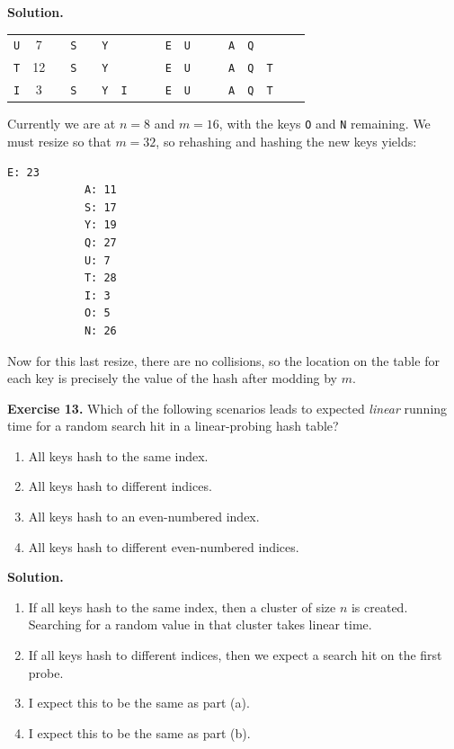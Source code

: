 \documentclass[12pt, a4paper]{article}
\newenvironment{ex}[2][Exercise]
{\par\medskip\noindent \textbf{#1 #2.}}
{\medskip}
\newenvironment{sol}[1][Solution]
{\par\medskip\noindent \textbf{#1.} }
{\medskip}
\begin{document}
\begin{sol}
\begin{center}
\begin{tabular}{cc|cccccccccccccccc}
				\texttt{U} & 7 &
				{} & {\color{gray}\texttt{S}} & {} & {\color{gray}\texttt{Y}} & {} & {} & {} & {\color{black} \texttt{E}} & {\color{red}\texttt{U}} & {} & {} & {\color{gray}\texttt{A}} & {\color{gray}\texttt{Q}} & {} & {} & {} \\
				
				\texttt{T} & 12 &
				{} & {\color{gray}\texttt{S}} & {} & {\color{gray}\texttt{Y}} & {} & {} & {} & {\color{gray} \texttt{E}} & {\color{gray}\texttt{U}} & {} & {} & {\color{gray}\texttt{A}} & {\color{black}\texttt{Q}} & {\color{red}\texttt{T}} & {} & {} \\
				
				\texttt{I} & 3 &
				{} & {\color{gray}\texttt{S}} & {} & {\color{black}\texttt{Y}} & {\color{red}\texttt{I}} & {} & {} & {\color{gray} \texttt{E}} & {\color{gray}\texttt{U}} & {} & {} & {\color{gray}\texttt{A}} & {\color{gray}\texttt{Q}} & {\color{gray}\texttt{T}} & {} & {} \\
			\end{tabular}
		\end{center}
		Currently we are at $n=8$ and $m=16$, with the keys \texttt{O} and \texttt{N} remaining.
		We must resize so that $m=32$, so rehashing and hashing the new keys yields:
		\begin{lstlisting}[language={}]
			E: 23
			A: 11
			S: 17
			Y: 19
			Q: 27
			U: 7
			T: 28
			I: 3
			O: 5
			N: 26
		\end{lstlisting}
		Now for this last resize, there are no collisions, so the location on the table for
		each key is precisely the value of the hash after modding by $m$.
	\end{sol}
	\begin{ex}{13}
		Which of the following scenarios leads to expected \emph{linear} running time for a random
		search hit in a linear-probing hash table?
		\begin{enumerate}[label=(\alph*)]
			\item All keys hash to the same index.
			\item All keys hash to different indices.
			\item All keys hash to an even-numbered index.
			\item All keys hash to different even-numbered indices.
		\end{enumerate}
	\end{ex}
	\begin{sol}
		\begin{enumerate}[label=(\alph*)]
			\item If all keys hash to the same index, then a cluster of size $n$ is created.
			Searching for a random value in that cluster takes linear time.
			\item If all keys hash to different indices, then we expect a search hit on the
			first probe.
			\item I expect this to be the same as part (a).
			\item I expect this to be the same as part (b).
		\end{enumerate}
	\end{sol}
\end{document}
